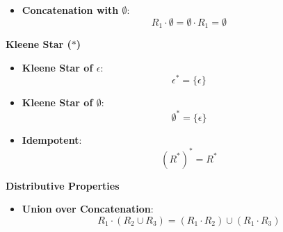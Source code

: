 \documentclass{report}
\begin{document}
\begin{itemize}
\begin{itemize}
            \item \textbf{Concatenation with \(\emptyset\)}:
                \[
                    R_1 \cdot \emptyset = \emptyset \cdot R_1 = \emptyset
                \]
        \end{itemize}
        \bigbreak \noindent 
        \textbf{Kleene Star (\(*\))}
        \begin{itemize}
            \item \textbf{Kleene Star of \(\epsilon\)}:
                \[
                    \epsilon^* = \{\epsilon\}
                \]

            \item \textbf{Kleene Star of \(\emptyset\)}:
                \[
                    \emptyset^* = \{\epsilon\}
                \]

            \item \textbf{Idempotent}:
                \[
                    (R^*)^* = R^*
                \]
        \end{itemize}
        \bigbreak \noindent 
        \textbf{Distributive Properties}
        \begin{itemize}
            \item \textbf{Union over Concatenation}:
                \[
                    R_1 \cdot (R_2 \cup R_3) = (R_1 \cdot R_2) \cup (R_1 \cdot R_3)
                \]


\end{itemize}
\end{itemize}
\end{document}
